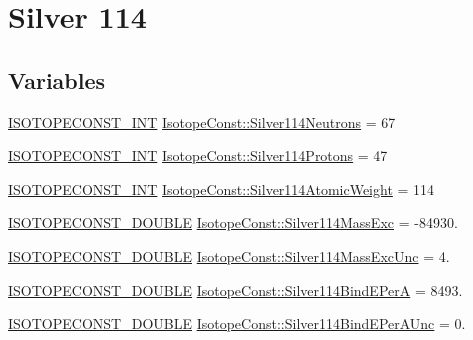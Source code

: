 \hypertarget{group___isotope_const-_silver-_ag114}{}\section{Silver 114}
\label{group___isotope_const-_silver-_ag114}
\subsection*{Variables}
\begin{DoxyCompactItemize}
\item 
\mbox{\hyperlink{group___isotope_const-_macros_ga5f18360b3e99483a35c32d789e62621c}{I\+S\+O\+T\+O\+P\+E\+C\+O\+N\+S\+T\+\_\+\+I\+NT}} \mbox{\hyperlink{group___isotope_const-_silver-_ag114_gae67d0271330b46838e2ad3d2c1fa80b6}{Isotope\+Const\+::\+Silver114\+Neutrons}} = 67
\item 
\mbox{\hyperlink{group___isotope_const-_macros_ga5f18360b3e99483a35c32d789e62621c}{I\+S\+O\+T\+O\+P\+E\+C\+O\+N\+S\+T\+\_\+\+I\+NT}} \mbox{\hyperlink{group___isotope_const-_silver-_ag114_gabc399b94bdac4c96d9b6780a72a3ffe4}{Isotope\+Const\+::\+Silver114\+Protons}} = 47
\item 
\mbox{\hyperlink{group___isotope_const-_macros_ga5f18360b3e99483a35c32d789e62621c}{I\+S\+O\+T\+O\+P\+E\+C\+O\+N\+S\+T\+\_\+\+I\+NT}} \mbox{\hyperlink{group___isotope_const-_silver-_ag114_ga6392264d48077f15e401c9c979a7ead4}{Isotope\+Const\+::\+Silver114\+Atomic\+Weight}} = 114
\item 
\mbox{\hyperlink{group___isotope_const-_macros_ga8f45a7272ce02c0b4c65c44636ed719a}{I\+S\+O\+T\+O\+P\+E\+C\+O\+N\+S\+T\+\_\+\+D\+O\+U\+B\+LE}} \mbox{\hyperlink{group___isotope_const-_silver-_ag114_ga3e222af0f558178d30cff78fc8fc9ea2}{Isotope\+Const\+::\+Silver114\+Mass\+Exc}} = -\/84930.
\item 
\mbox{\hyperlink{group___isotope_const-_macros_ga8f45a7272ce02c0b4c65c44636ed719a}{I\+S\+O\+T\+O\+P\+E\+C\+O\+N\+S\+T\+\_\+\+D\+O\+U\+B\+LE}} \mbox{\hyperlink{group___isotope_const-_silver-_ag114_ga5e1e64c0d445cc49d7d542f038bce4ce}{Isotope\+Const\+::\+Silver114\+Mass\+Exc\+Unc}} = 4.
\item 
\mbox{\hyperlink{group___isotope_const-_macros_ga8f45a7272ce02c0b4c65c44636ed719a}{I\+S\+O\+T\+O\+P\+E\+C\+O\+N\+S\+T\+\_\+\+D\+O\+U\+B\+LE}} \mbox{\hyperlink{group___isotope_const-_silver-_ag114_gaa83ed51f12c978ebeef0f48a4fab1dc4}{Isotope\+Const\+::\+Silver114\+Bind\+E\+PerA}} = 8493.
\item 
\mbox{\hyperlink{group___isotope_const-_macros_ga8f45a7272ce02c0b4c65c44636ed719a}{I\+S\+O\+T\+O\+P\+E\+C\+O\+N\+S\+T\+\_\+\+D\+O\+U\+B\+LE}} \mbox{\hyperlink{group___isotope_const-_silver-_ag114_gae4669c039a1be620495dac55435d9587}{Isotope\+Const\+::\+Silver114\+Bind\+E\+Per\+A\+Unc}} = 0.

\end{DoxyCompactItemize}
